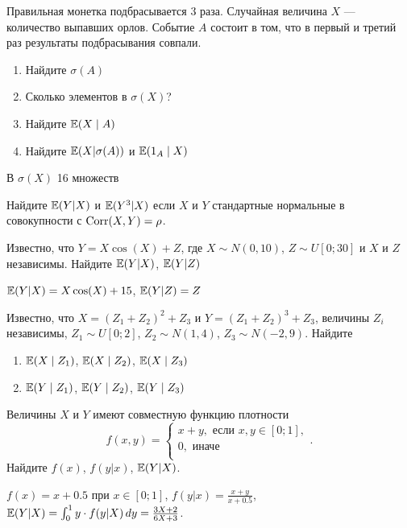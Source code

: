 \begin{problem}
 Правильная монетка подбрасывается 3 раза. Случайная величина $X$ — количество выпавших орлов. Событие $A$ состоит в том, что в первый и третий раз результаты подбрасывания совпали.
\begin{enumerate}
\item Найдите $\sigma(A)$
\item Сколько элементов в $\sigma(X)$?
\item Найдите $\mathbb{E}(X\mid A)$
\item Найдите $\mathbb{E}(X|\sigma(A))$ и $\mathbb{E}(1_A \mid X)$
\end{enumerate}

\begin{sol}
 В $\sigma(X)$ 16 множеств
\end{sol}
\end{problem}

\begin{problem}
Найдите $\mathbb{E}(Y|X)$ и $\mathbb{E}(Y^3|X)$ если $X$ и $Y$ стандартные нормальные в совокупности с $\operatorname{Corr}(X,Y)=\rho$.

\begin{sol}

\end{sol}
\end{problem}

\begin{problem}
Известно, что $Y=X\cos(X)+Z$, где $X\sim N(0,10)$, $Z\sim U[0;30]$ и $X$ и $Z$ независимы. Найдите $\mathbb{E}(Y|X)$, $\mathbb{E}(Y|Z)$

\begin{sol}
$\mathbb{E}(Y|X)=X\cos(X)+15$, $\mathbb{E}(Y|Z)=Z$
\end{sol}
\end{problem}

\begin{problem}
Известно, что $X=(Z_1+Z_2)^2+Z_3$ и $Y=(Z_1+Z_2)^3+Z_3$, величины $Z_i$ независимы, $Z_1\sim U[0;2]$, $Z_2\sim N(1,4)$, $Z_3\sim N(-2,9)$. Найдите
\begin{enumerate}
\item $\mathbb{E}(X \mid Z_1)$, $\mathbb{E}(X \mid Z_2)$, $\mathbb{E}(X \mid Z_3)$
\item $\mathbb{E}(Y \mid Z_1)$, $\mathbb{E}(Y \mid Z_2)$, $\mathbb{E}(Y \mid Z_3)$
\end{enumerate}


\begin{sol}
\end{sol}
\end{problem}

\begin{problem}
Величины $X$ и $Y$ имеют совместную функцию плотности
\[
f(x, y) = \begin{cases}
x+y, \text{ если } x, y \in [0; 1], \\
0, \text{ иначе } \\
\end{cases}.
\]
Найдите $f(x)$, $f(y|x)$, $\mathbb{E}(Y|X)$.
\begin{sol}
  $f(x)=x+0.5$ при $x\in[0; 1]$, $f(y|x) = \frac{x+y}{x+0.5}$, $\mathbb{E}(Y|X) = \int_0^1 y \cdot f(y|X) \, dy = \frac{3X+2}{6X+3}$.
\end{sol}
\end{problem}


